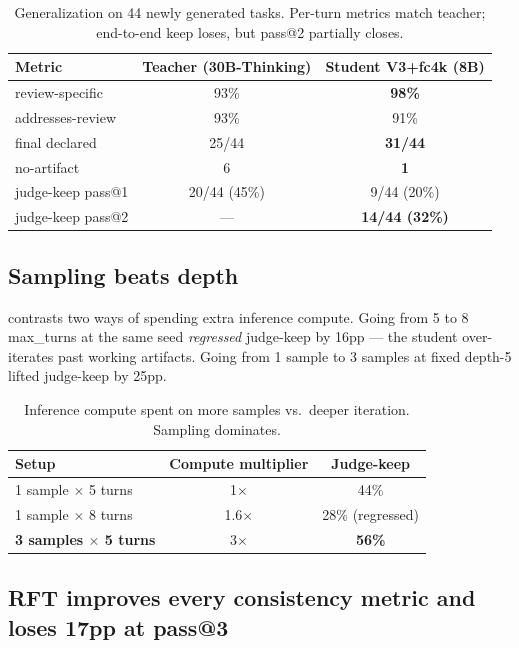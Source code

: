 \documentclass[11pt]{article}
\begin{document}
\begin{table}[t]
\centering
\caption{Generalization on 44 newly generated tasks. Per-turn metrics match teacher; end-to-end keep loses, but pass@2 partially closes.}
\label{tab:gen-44}
\begin{tabular}{lcc}
\toprule
Metric & Teacher (30B-Thinking) & Student V3+fc4k (8B) \\
\midrule
review-specific & 93\% & \textbf{98\%} \\
addresses-review & 93\% & 91\% \\
final declared & 25/44 & \textbf{31/44} \\
no-artifact & 6 & \textbf{1} \\
\midrule
judge-keep pass@1 & 20/44 (45\%) & 9/44 (20\%) \\
judge-keep pass@2 & --- & \textbf{14/44 (32\%)} \\
\bottomrule
\end{tabular}
\end{table}

\subsection{Sampling beats depth}

 contrasts two ways of spending extra inference compute. Going from 5 to 8 max\_turns at the same seed \emph{regressed} judge-keep by 16pp --- the student over-iterates past working artifacts. Going from 1 sample to 3 samples at fixed depth-5 lifted judge-keep by 25pp.

\begin{table}[t]
\centering
\caption{Inference compute spent on more samples vs.\ deeper iteration. Sampling dominates.}
\label{tab:sampling-vs-depth}
\begin{tabular}{lcc}
\toprule
Setup & Compute multiplier & Judge-keep \\
\midrule
1 sample $\times$ 5 turns & 1$\times$ & 44\% \\
1 sample $\times$ 8 turns & 1.6$\times$ & 28\% (regressed) \\
\textbf{3 samples $\times$ 5 turns} & 3$\times$ & \textbf{56\%} \\
\bottomrule
\end{tabular}
\end{table}

\subsection{RFT improves every consistency metric and loses 17pp at pass@3}
\end{document}
